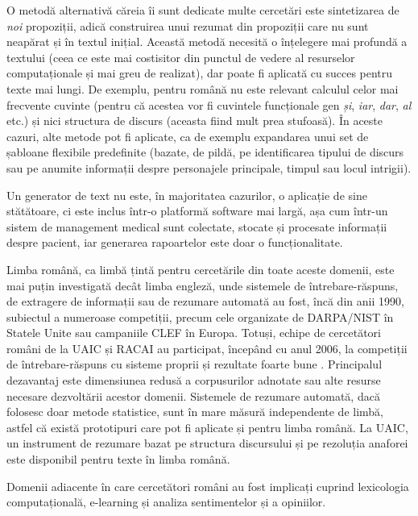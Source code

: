 \begin{multicols}{2}
O metodă alternativă căreia îi sunt dedicate multe cercetări este sintetizarea de \textit{noi} propoziții, adică construirea unui rezumat din propoziții care nu sunt neapărat și în textul inițial. Această metodă necesită o înțelegere mai profundă a textului (ceea ce este mai costisitor din punctul de vedere al resurselor computaționale și mai greu de realizat), dar poate fi aplicată cu succes pentru texte mai lungi. De exemplu, pentru română nu este relevant calculul celor mai frecvente cuvinte (pentru că acestea vor fi cuvintele funcționale gen \textit{și}, \textit{iar}, \textit{dar}, \textit{al} etc.) și nici structura de discurs (aceasta fiind mult prea stufoasă). În aceste cazuri, alte metode pot fi aplicate, ca de exemplu expandarea unui set de șabloane flexibile predefinite (bazate, de pildă, pe identificarea tipului de discurs sau pe anumite informații despre personajele principale, timpul sau locul intrigii). 

Un generator de text nu este, în majoritatea cazurilor, o aplicație de sine stătătoare, ci este inclus într-o platformă software mai largă, așa cum într-un sistem de management medical sunt colectate, stocate și procesate informații despre pacient, iar generarea rapoartelor este doar o funcționalitate.


Limba română, ca limbă țintă pentru cercetările din toate aceste domenii, este mai puțin investigată decât limba engleză, unde sistemele de întrebare-răspuns, de extragere de informații sau de rezumare automată au fost, încă din anii 1990, subiectul a numeroase competiții, precum cele organizate de DARPA/NIST în Statele Unite sau campaniile CLEF în Europa. Totuși, echipe de cercetători români de la UAIC și RACAI au participat, începând cu anul 2006, la competiții de întrebare-răspuns cu sisteme proprii și rezultate foarte bune \cite{qa}. Principalul dezavantaj este dimensiunea redusă a corpusurilor adnotate sau alte resurse necesare dezvoltării acestor domenii. Sistemele de rezumare automată, dacă folosesc doar metode statistice, sunt în mare măsură independente de limbă, astfel că există prototipuri care pot fi aplicate și pentru limba română. La UAIC, un instrument de rezumare bazat pe structura discursului și pe rezoluția anaforei este disponibil pentru texte în limba română.

Domenii adiacente în care cercetători români au fost implicați cuprind lexicologia computațională, e-learning și analiza sentimentelor și a opiniilor. 


\end{multicols}
